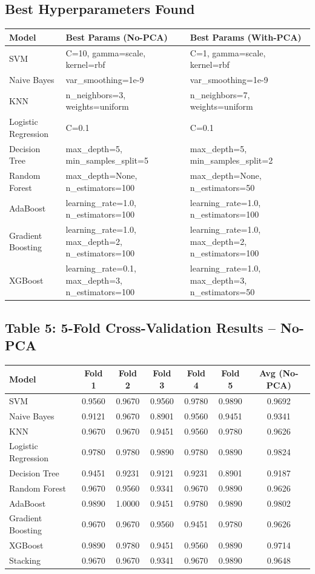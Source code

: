 \documentclass[12pt,a4paper]{article}
\begin{document}
\subsection*{Best Hyperparameters Found}
\begin{longtable}{lll}
\toprule
Model & Best Params (No-PCA) & Best Params (With-PCA)\\
\midrule
SVM & C=10, gamma=scale, kernel=rbf & C=1, gamma=scale, kernel=rbf \\
Naive Bayes & var\_smoothing=1e-9 & var\_smoothing=1e-9 \\
KNN & n\_neighbors=3, weights=uniform & n\_neighbors=7, weights=uniform \\
Logistic Regression & C=0.1 & C=0.1 \\
Decision Tree & max\_depth=5, min\_samples\_split=5 & max\_depth=5, min\_samples\_split=2 \\
Random Forest & max\_depth=None, n\_estimators=100 & max\_depth=None, n\_estimators=50 \\
AdaBoost & learning\_rate=1.0, n\_estimators=100 & learning\_rate=1.0, n\_estimators=100 \\
Gradient Boosting & learning\_rate=1.0, max\_depth=2, n\_estimators=100 & learning\_rate=1.0, max\_depth=2, n\_estimators=100 \\
XGBoost & learning\_rate=0.1, max\_depth=3, n\_estimators=100 & learning\_rate=1.0, max\_depth=3, n\_estimators=50 \\
\bottomrule
\end{longtable}

\subsection*{Table 5: 5-Fold Cross-Validation Results -- No-PCA}
\begin{longtable}{lcccccc}
\toprule
Model & Fold 1 & Fold 2 & Fold 3 & Fold 4 & Fold 5 & Avg (No-PCA)\\
\midrule
SVM & 0.9560 & 0.9670 & 0.9560 & 0.9780 & 0.9890 & 0.9692 \\
Naive Bayes & 0.9121 & 0.9670 & 0.8901 & 0.9560 & 0.9451 & 0.9341 \\
KNN & 0.9670 & 0.9670 & 0.9451 & 0.9560 & 0.9780 & 0.9626 \\
Logistic Regression & 0.9780 & 0.9780 & 0.9890 & 0.9780 & 0.9890 & 0.9824 \\
Decision Tree & 0.9451 & 0.9231 & 0.9121 & 0.9231 & 0.8901 & 0.9187 \\
Random Forest & 0.9670 & 0.9560 & 0.9341 & 0.9670 & 0.9890 & 0.9626 \\
AdaBoost & 0.9890 & 1.0000 & 0.9451 & 0.9780 & 0.9890 & 0.9802 \\
Gradient Boosting & 0.9670 & 0.9670 & 0.9560 & 0.9451 & 0.9780 & 0.9626 \\
XGBoost & 0.9890 & 0.9780 & 0.9451 & 0.9560 & 0.9890 & 0.9714 \\
Stacking & 0.9670 & 0.9670 & 0.9341 & 0.9670 & 0.9890 & 0.9648 \\
\bottomrule
\end{longtable}
\end{document}
